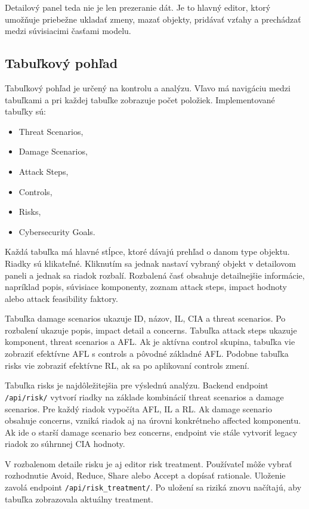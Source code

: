 \documentclass[11pt]{article}
\begin{document}
Detailový panel teda nie je len prezeranie dát. Je to hlavný editor, ktorý umožňuje priebežne ukladať zmeny, mazať objekty, pridávať vzťahy a prechádzať medzi súvisiacimi časťami modelu.

\subsection{Tabuľkový pohľad}

Tabuľkový pohľad je určený na kontrolu a analýzu. Vľavo má navigáciu medzi tabuľkami a pri každej tabuľke zobrazuje počet položiek. Implementované tabuľky sú:

\begin{itemize}
    \item Threat Scenarios,
    \item Damage Scenarios,
    \item Attack Steps,
    \item Controls,
    \item Risks,
    \item Cybersecurity Goals.
\end{itemize}

Každá tabuľka má hlavné stĺpce, ktoré dávajú prehľad o danom type objektu. Riadky sú klikateľné. Kliknutím sa jednak nastaví vybraný objekt v detailovom paneli a jednak sa riadok rozbalí. Rozbalená časť obsahuje detailnejšie informácie, napríklad popis, súvisiace komponenty, zoznam attack steps, impact hodnoty alebo attack feasibility faktory.

Tabuľka damage scenarios ukazuje ID, názov, IL, CIA a threat scenarios. Po rozbalení ukazuje popis, impact detail a concerns. Tabuľka attack steps ukazuje komponent, threat scenarios a AFL. Ak je aktívna control skupina, tabuľka vie zobraziť efektívne AFL s controls a pôvodné základné AFL. Podobne tabuľka risks vie zobraziť efektívne RL, ak sa po aplikovaní controls zmení.

Tabuľka risks je najdôležitejšia pre výslednú analýzu. Backend endpoint \texttt{/api/risk/} vytvorí riadky na základe kombinácií threat scenarios a damage scenarios. Pre každý riadok vypočíta AFL, IL a RL. Ak damage scenario obsahuje concerns, vzniká riadok aj na úrovni konkrétneho affected komponentu. Ak ide o starší damage scenario bez concerns, endpoint vie stále vytvoriť legacy riadok zo súhrnnej CIA hodnoty.

V rozbalenom detaile risku je aj editor risk treatment. Používateľ môže vybrať rozhodnutie Avoid, Reduce, Share alebo Accept a dopísať rationale. Uloženie zavolá endpoint \texttt{/api/risk\_treatment/}. Po uložení sa riziká znovu načítajú, aby tabuľka zobrazovala aktuálny treatment.
\end{document}

